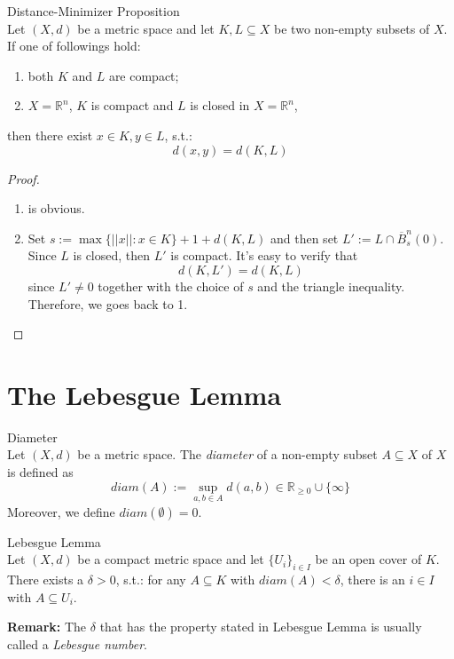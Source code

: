 \begin{proposition}{Distance-Minimizer Proposition}\\
Let $(X,d)$ be a metric space and let $K,L \subseteq X$ be two non-empty subsets of $X$. If one of followings hold:
\begin{enumerate}
    \item both $K$ and $L$ are compact;
    \item $X=\mathbb{R}^n$, $K$ is compact and $L$ is closed in $X= \mathbb{R}^n$,
\end{enumerate}
then there exist $x \in K,y\in L$, s.t.:
$$d(x,y) = d(K,L)$$
\end{proposition}

\begin{proof}
    \begin{enumerate}
        \item is obvious.
        \item Set $s:= \max\{ ||x||: x \in K\} +1+ d(K,L)$ and then set $L':= L \cap \overline{B}^n_s (0)$. Since $L$ is closed, then $L'$ is compact. It's easy to verify that
        $$d(K,L') = d(K,L)$$
        since $L'\neq 0$ together with the choice of $s$ and the triangle inequality. Therefore, we goes back to 1.
    \end{enumerate}
\end{proof}

\section{The Lebesgue Lemma}

\begin{definition}{Diameter}\\
Let $(X,d)$ be a metric space. The \textit{diameter} of a non-empty subset $A \subseteq X$ of $X$ is defined as
$$diam (A):= \sup_{a,b \in A} d(a,b) \in \mathbb{R}_{\geq 0} \cup \{\infty\}$$
Moreover, we define $diam (\emptyset) =0$.
\end{definition}

\begin{theorem}{Lebesgue Lemma}\\
Let $(X,d)$ be a compact metric space and let $\{U_i\}_{i \in I}$ be an open cover of $K$. There exists a $\delta >0$, s.t.: for any $A \subseteq K$ with $diam(A)< \delta$, there is an $i \in I$ with $A \subseteq U_i$.
\end{theorem}

\noindent\textbf{Remark:} The $\delta$ that has the property stated in Lebesgue Lemma is usually called a \textit{Lebesgue number}.

